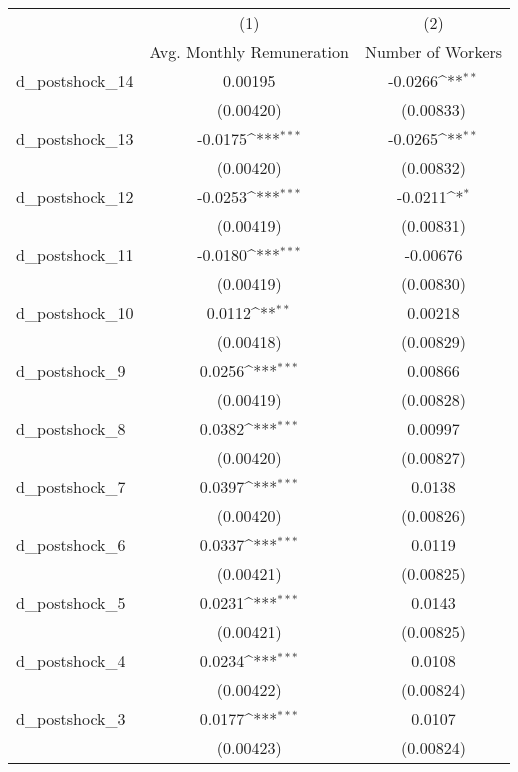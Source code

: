 {
\def\sym#1{\ifmmode^{#1}\else\(^{#1}\)\fi}
\begin{tabular}{l*{2}{c}}
\hline\hline
          &\multicolumn{1}{c}{(1)}&\multicolumn{1}{c}{(2)}\\
          &\multicolumn{1}{c}{Avg. Monthly Remuneration}&\multicolumn{1}{c}{Number of Workers}\\
\hline
d\_postshock\_14&  0.00195         &  -0.0266\sym{**} \\
          &(0.00420)         &(0.00833)         \\
d\_postshock\_13&  -0.0175\sym{***}&  -0.0265\sym{**} \\
          &(0.00420)         &(0.00832)         \\
d\_postshock\_12&  -0.0253\sym{***}&  -0.0211\sym{*}  \\
          &(0.00419)         &(0.00831)         \\
d\_postshock\_11&  -0.0180\sym{***}& -0.00676         \\
          &(0.00419)         &(0.00830)         \\
d\_postshock\_10&   0.0112\sym{**} &  0.00218         \\
          &(0.00418)         &(0.00829)         \\
d\_postshock\_9&   0.0256\sym{***}&  0.00866         \\
          &(0.00419)         &(0.00828)         \\
d\_postshock\_8&   0.0382\sym{***}&  0.00997         \\
          &(0.00420)         &(0.00827)         \\
d\_postshock\_7&   0.0397\sym{***}&   0.0138         \\
          &(0.00420)         &(0.00826)         \\
d\_postshock\_6&   0.0337\sym{***}&   0.0119         \\
          &(0.00421)         &(0.00825)         \\
d\_postshock\_5&   0.0231\sym{***}&   0.0143         \\
          &(0.00421)         &(0.00825)         \\
d\_postshock\_4&   0.0234\sym{***}&   0.0108         \\
          &(0.00422)         &(0.00824)         \\
d\_postshock\_3&   0.0177\sym{***}&   0.0107         \\
          &(0.00423)         &(0.00824)         \\

\end{tabular}}
